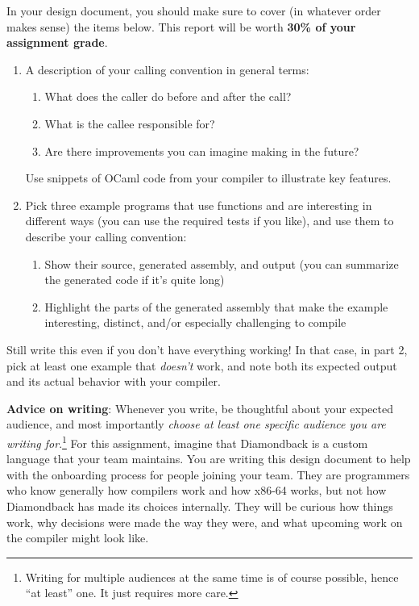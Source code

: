 \documentclass[10pt, oneside]{article}
\begin{document}
In your design document, you should make sure to cover (in whatever order
makes sense) the items below. This report will be worth {\bf 30\% of your
assignment grade}.

\begin{enumerate}
  \item A description of your calling convention in general terms:
    \begin{enumerate}
      \item What does the caller do before and after the call?
      \item What is the callee responsible for?
      \item Are there improvements you can imagine making in the future?
    \end{enumerate}
    Use snippets of OCaml code from your compiler to illustrate key features.
  \item Pick three example programs that use functions and are interesting in
  different ways (you can use the required tests if you like), and use them
  to describe your calling convention:
  \begin{enumerate}
    \item Show their source, generated assembly, and output (you can
    summarize the generated code if it's quite long)
    \item Highlight the parts of the generated assembly that make the example
    interesting, distinct, and/or especially challenging to compile
  \end{enumerate}
\end{enumerate}

Still write this even if you don't have everything working! In that case, in
part 2, pick at least one example that {\it doesn't} work, and note both its
expected output and its actual behavior with your compiler.

{\bf Advice on writing}: Whenever you write, be thoughtful about your
expected audience, and most importantly {\it choose at least one specific
audience you are writing for}.\footnote{Writing for multiple audiences at the
same time is of course possible, hence ``at least'' one. It just requires
more care.} For this assignment, imagine that Diamondback is a custom
language that your team maintains. You are writing this design document to
help with the onboarding process for people joining your team. They are
programmers who know generally how compilers work and how x86-64 works, but
not how Diamondback has made its choices internally. They will be curious how
things work, why decisions were made the way they were, and what upcoming
work on the compiler might look like.
\end{document}
